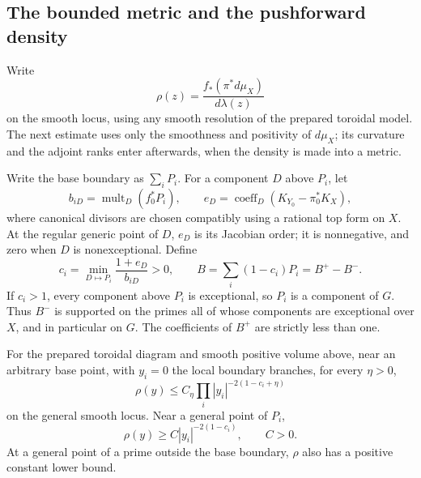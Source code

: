 \subsection{The bounded metric and the pushforward density}
\label{g:cf:metrics}

Write
\begin{equation}\label{g:cf:rho}
 \rho(z)=\frac{f_*(\pi^*d\mu_X)}{d\lambda(z)}
\end{equation}
on the smooth locus, using any smooth resolution of the prepared
toroidal model. The next estimate uses only the smoothness and
positivity of $d\mu_X$; its curvature and the adjoint ranks enter
afterwards, when the density is made into a metric.

Write the base boundary as $\sum_iP_i$.  For a component $D$
above $P_i$, let
\[
 b_{iD}=\operatorname{mult}_D(f_0^*P_i),\qquad
 e_D=\operatorname{coeff}_D(K_{Y_0}-\pi_0^*K_X),
\]
where canonical divisors are chosen compatibly using a rational top
form on $X$.  At the regular generic point of $D$, $e_D$ is its
Jacobian order; it is nonnegative, and zero when $D$ is
nonexceptional.  Define
\begin{equation}\label{g:cf:thresholds}
 c_i=\min_{D\mapsto P_i}\frac{1+e_D}{b_{iD}}>0,
 \qquad B=\sum_i(1-c_i)P_i=B^+-B^-.
\end{equation}
If $c_i>1$, every component above $P_i$ is exceptional, so $P_i$ is
a component of $G$.  Thus $B^-$ is supported on the primes all of whose components
are exceptional over $X$, and in particular on $G$.  The coefficients of $B^+$ are strictly less than one.


\begin{lemma}\label{g:cf:density-bounds}
For the prepared toroidal diagram and smooth positive volume above,
near an arbitrary base point,
with $y_i=0$ the local boundary branches, for every $\eta>0$,
\begin{equation}\label{g:cf:upper-density}
 \rho(y)\leq C_\eta
       \prod_i|y_i|^{-2(1-c_i+\eta)}
\end{equation}
on the general smooth locus.  Near a general point of $P_i$,
\begin{equation}\label{g:cf:lower-density}
 \rho(y)\geq C|y_i|^{-2(1-c_i)},\qquad C>0.
\end{equation}
At a general point of a prime outside the base boundary, $\rho$ also
has a positive constant lower bound.

\end{lemma}

